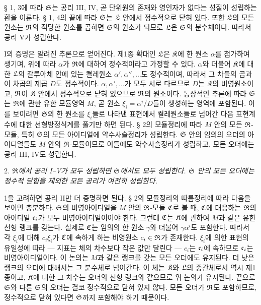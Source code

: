 § 1, 3에 따라 \(\mathfrak S\)는 공리 III, IV, 곧 단위원의 존재와 영인자가 없다는 성질이 성립하는 환을 이룬다. § 1, 4의 끝에 따라 \(\mathfrak S\)는 \(\mathfrak{L}\) 안에서 정수적으로 닫혀 있다. 또한 \(\mathfrak{L}\)의 모든 원소는 \(\mathfrak{R}\)의 적당한 원소를 곱하면 \(\mathfrak S\)의 원소가 되므로 \(\mathfrak{L}\)은 \(\mathfrak S\)의 분수체이다. 따라서 공리 V가 성립한다.

I의 증명은 알려진 추론으로 얻어진다. 제1종 확대인 \(\mathfrak{L}\)은 \(\mathfrak{K}\)에 한 원소 \(\alpha\)를 첨가하여 생기며, 위에 따라 \(\alpha\)가 \(\mathfrak{R}\)에 대하여 정수적이라고 가정할 수 있다. \(\alpha\)와 더불어 \(\mathfrak{K}\)에 대한 \(\mathfrak{L}\)의 갈루아체 안에 있는 켤레원소 \(\alpha',\alpha'',\ldots\)도 정수적이며, 따라서 그 차들의 곱과 이 차곱의 제곱 \(D\)도 정수적이다. \(\alpha,\alpha',\ldots\)가 모두 서로 다르므로 \(D\)는 \(\mathfrak{K}\)의 비영원소이고, \(\mathfrak{R}\)이 \(\mathfrak{K}\) 안에서 정수적으로 닫혀 있으므로 \(\mathfrak{R}\)의 원소이다. 통상적인 추론에 따라 \(\mathfrak S\)는 \(\mathfrak{R}\)에 관한 유한 모듈영역 \(M\), 곧 원소 \(\xi_i=\alpha^i/D\)들이 생성하는 영역에 포함된다. 이를 보이려면 \(\mathfrak S\)의 한 원소를 \(\xi_i\)들로 나타낸 표현에서 켤레원소들로 넘어간 다음 표현계수에 대한 선형방정식계를 풀기만 하면 된다. § 2의 모듈정리에 따라 \(M\) 안의 모든 \(\mathfrak{R}\)-모듈, 특히 \(\mathfrak S\)의 모든 아이디얼에 약수사슬정리가 성립한다. \(\mathfrak S\) 안의 임의의 오더의 아이디얼들도 \(M\) 안의 \(\mathfrak{R}\)-모듈이므로 이들에도 약수사슬정리가 성립하고, 모든 오더에는 공리 III, IV도 성립한다.

2. \emph{\(\mathfrak{R}\)에서 공리 I--V가 모두 성립하면 \(\mathfrak S\)에서도 모두 성립한다. \(\mathfrak S\) 안의 모든 오더에는 정수적 닫힘을 제외한 모든 공리가 여전히 성립한다.}

1을 고려하면 공리 II만 더 증명하면 된다. § 2의 모듈정리의 따름정리에 따라 다음을 보이면 충분하다. \(\mathfrak S\)의 비영아이디얼을 \(M\) 안의 \(\mathfrak{R}\)-모듈 \(\mathfrak{C}\)로 볼 때, \(\mathfrak{C}\)에 대응하는 \(\mathfrak{R}\)의 아이디얼 \(\mathfrak{c}_i\)가 모두 비영아이디얼이어야 한다. 그런데 \(\mathfrak{C}\)는 \(\mathfrak{K}\)에 관하여 \(M\)과 같은 유한 선형 랭크를 갖는다. 실제로 \(\mathfrak{C}\)는 임의의 한 원소 \(\gamma\)와 더불어 \(\gamma\alpha^i\)도 포함한다. 따라서 각 \(\xi_i\)에 대해 \(c_i\xi_i\)가 \(\mathfrak{C}\)에 속하게 하는 비영원소 \(c_i\in\mathfrak{R}\)가 존재한다. \(\xi_i\)에 의한 표현의 유일성에 따라 --- 지표는 체의 차수보다 작은 값만 달린다 --- \(c_i\)는 \(\mathfrak{c}_i\)에 속하므로 \(\mathfrak{c}_i\)는 비영아이디얼이다. 이 논의는 \(M\)과 같은 랭크를 갖는 모든 오더에도 유지된다. 더 낮은 랭크의 오더에 대해서는 그 분수체로 넘어간다. 이 체는 \(\mathfrak{K}\)와 \(\mathfrak{L}\)의 중간체로서 역시 제1종이고, \(\mathfrak{K}\)에 대한 그 차수는 오더의 선형 랭크와 같으므로 위 논의가 유지된다. 끝으로 \(\mathfrak S\)와 다른 \(\mathfrak S\)의 오더는 결코 정수적으로 닫혀 있지 않다. 모든 오더가 \(\mathfrak{R}\)도 포함하므로, 정수적으로 닫혀 있다면 \(\mathfrak S\)까지 포함해야 하기 때문이다.

